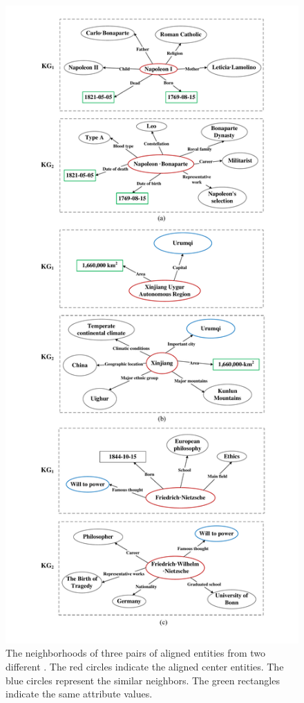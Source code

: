 	\begin{figure}
		\begin{center}
			\includegraphics[width=1\linewidth]{figures/graph1.pdf}
			\caption{The neighborhoods of three pairs of aligned entities from two different \KGs. The red circles indicate the aligned center entities. The blue circles represent the similar neighbors. The green rectangles indicate the same attribute values.}
			\label{Wuhan}
		\end{center}
	\end{figure}
